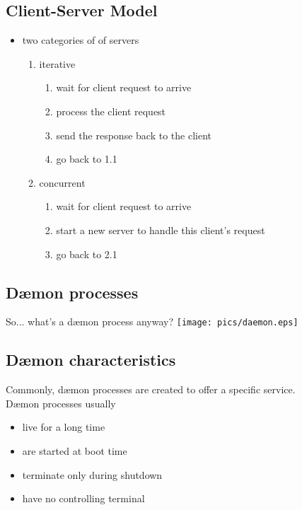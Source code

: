 \documentclass[xga]{xdvislides}
\begin{document}
\subsection{Client-Server Model}
\begin{itemize}
	\item two categories of of servers
		\begin{enumerate}
			\item iterative
				\begin{enumerate}
					\item wait for client request to arrive
					\item process the client request
					\item send the response back to the client
					\item go back to 1.1
				\end{enumerate}
			\item concurrent
				\begin{enumerate}
					\item wait for client request to arrive
					\item start a new server to handle this client's request
					\item go back to 2.1
				\end{enumerate}
		\end{enumerate}
\end{itemize}

\subsection{D\ae mon processes}
So... what's a d\ae mon process anyway?
\vfill
\hfill\texttt{[image: pics/daemon.eps]} \\

\subsection{D\ae mon characteristics}
Commonly, d\ae mon processes are created to offer a specific service.
\\

D\ae mon processes usually
\begin{itemize}
	\item live for a long time
	\item are started at boot time
	\item terminate only during shutdown
	\item have no controlling terminal
\end{itemize}
\end{document}
